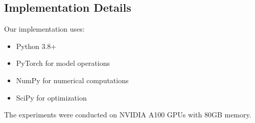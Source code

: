 \subsection{Implementation Details}
Our implementation uses:

\begin{itemize}
    \item Python 3.8+
    \item PyTorch for model operations
    \item NumPy for numerical computations
    \item SciPy for optimization
\end{itemize}

The experiments were conducted on NVIDIA A100 GPUs with 80GB memory. 